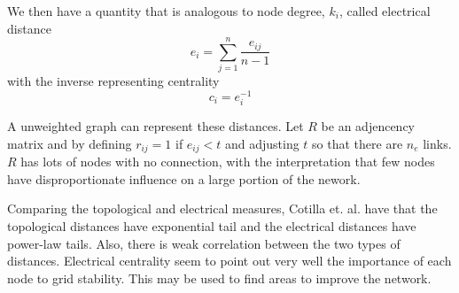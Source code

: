 We then have a quantity that is analogous to node degree, $k_i$, called electrical distance
\begin{equation}
e_i = \sum_{j=1}^n \frac{e_{ij}}{n-1}
\end{equation}
with the inverse representing centrality
\begin{equation}
c_i = e_i^{-1}
\end{equation}

A unweighted graph can represent these distances.  Let $R$ be an adjencency matrix and by defining $r_{ij} = 1 $ if $e_{ij} < t$ and adjusting $t$ so that there are  $n_e$ links.  $R$ has lots of nodes with no connection, with the interpretation that few nodes have disproportionate influence on a large portion of the nework.

Comparing the topological and electrical measures, Cotilla et. al. \cite{cotilla_2012} have that the topological distances have exponential tail and the electrical distances have power-law tails.  Also, there is weak correlation between the two types of distances.  Electrical centrality seem to point out very well the importance of each node to grid stability.  This may be used to find areas to improve the network.